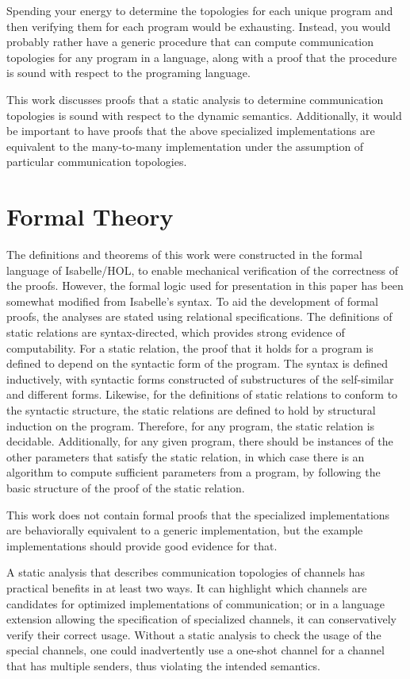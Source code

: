 \documentclass[letterpaper, 11pt]{extarticle}
\begin{document}
Spending your energy to determine the topologies for each unique program and then verifying
them for each program would be exhausting. Instead, you would probably rather have a generic
procedure that can compute communication topologies for any program in a language, along with
a proof that the procedure is sound with respect to the programing language.

This work discusses proofs that a static analysis to determine communication topologies is
sound with respect to the dynamic semantics.
Additionally, it would be important to have proofs that the above specialized
implementations are equivalent to the many-to-many implementation under the assumption of
particular communication topologies.

\section{Formal Theory}

The definitions and theorems of this work were constructed in the formal
language of Isabelle/HOL,
to enable mechanical verification of the correctness of the proofs.
However, the formal logic used
for presentation in this paper has been somewhat modified from Isabelle's syntax. 
To aid the development of formal proofs,
the analyses are stated using relational specifications.
The definitions of static relations are syntax-directed, which provides
strong evidence of computability.
For a static relation, the proof that it holds for a program is defined
to depend on the syntactic form of the program.
The syntax is defined inductively, with syntactic forms constructed of 
substructures of the self-similar and different forms.   
Likewise, for the definitions of static relations to conform to the
syntactic structure, the static relations are defined to hold
by structural induction on the program.
Therefore, for any program, the static relation is decidable.
Additionally, for any given program, there should be instances of the other
parameters that satisfy the static relation, in which case there is an
algorithm to compute sufficient parameters from a program,
by following the basic structure of the proof of the static relation.

This work does not contain formal proofs that the specialized implementations are
behaviorally equivalent to a generic implementation, but the example implementations
should provide good evidence for that.

A static analysis that describes communication
topologies of channels has practical benefits in at least two ways.  It can highlight which
channels are candidates for optimized implementations of communication; or in a language
extension allowing the specification of specialized channels, it can conservatively verify
their correct usage. Without a static analysis to check the usage of the special channels, one
could inadvertently use a one-shot channel for a channel that has multiple senders, thus
violating the intended semantics. 
\end{document}
